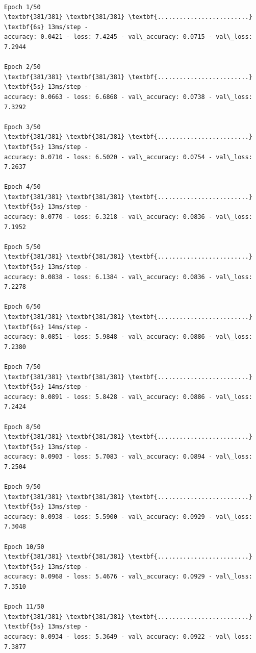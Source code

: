 \documentclass[11pt]{article}
\begin{document}
\begin{tcolorbox}[breakable, size=fbox, boxrule=1pt, pad at break*=1mm,colback=cellbackground, colframe=cellborder]
    \begin{Verbatim}[commandchars=\\\{\}]
        
Epoch 1/50
\textbf{381/381} \textbf{381/381} \textbf{.........................} \textbf{6s} 13ms/step -
accuracy: 0.0421 - loss: 7.4245 - val\_accuracy: 0.0715 - val\_loss: 7.2944

Epoch 2/50
\textbf{381/381} \textbf{381/381} \textbf{.........................} \textbf{5s} 13ms/step -
accuracy: 0.0663 - loss: 6.6868 - val\_accuracy: 0.0738 - val\_loss: 7.3292

Epoch 3/50
\textbf{381/381} \textbf{381/381} \textbf{.........................} \textbf{5s} 13ms/step -
accuracy: 0.0710 - loss: 6.5020 - val\_accuracy: 0.0754 - val\_loss: 7.2637

Epoch 4/50
\textbf{381/381} \textbf{381/381} \textbf{.........................} \textbf{5s} 13ms/step -
accuracy: 0.0770 - loss: 6.3218 - val\_accuracy: 0.0836 - val\_loss: 7.1952

Epoch 5/50
\textbf{381/381} \textbf{381/381} \textbf{.........................} \textbf{5s} 13ms/step -
accuracy: 0.0838 - loss: 6.1384 - val\_accuracy: 0.0836 - val\_loss: 7.2278

Epoch 6/50
\textbf{381/381} \textbf{381/381} \textbf{.........................} \textbf{6s} 14ms/step -
accuracy: 0.0851 - loss: 5.9848 - val\_accuracy: 0.0886 - val\_loss: 7.2380

Epoch 7/50
\textbf{381/381} \textbf{381/381} \textbf{.........................} \textbf{5s} 14ms/step -
accuracy: 0.0891 - loss: 5.8428 - val\_accuracy: 0.0886 - val\_loss: 7.2424

Epoch 8/50
\textbf{381/381} \textbf{381/381} \textbf{.........................} \textbf{5s} 13ms/step -
accuracy: 0.0903 - loss: 5.7083 - val\_accuracy: 0.0894 - val\_loss: 7.2504

Epoch 9/50
\textbf{381/381} \textbf{381/381} \textbf{.........................} \textbf{5s} 13ms/step -
accuracy: 0.0938 - loss: 5.5900 - val\_accuracy: 0.0929 - val\_loss: 7.3048

Epoch 10/50
\textbf{381/381} \textbf{381/381} \textbf{.........................} \textbf{5s} 13ms/step -
accuracy: 0.0968 - loss: 5.4676 - val\_accuracy: 0.0929 - val\_loss: 7.3510

Epoch 11/50
\textbf{381/381} \textbf{381/381} \textbf{.........................} \textbf{5s} 13ms/step -
accuracy: 0.0934 - loss: 5.3649 - val\_accuracy: 0.0922 - val\_loss: 7.3877


\end{Verbatim}
\end{tcolorbox}
\end{document}
